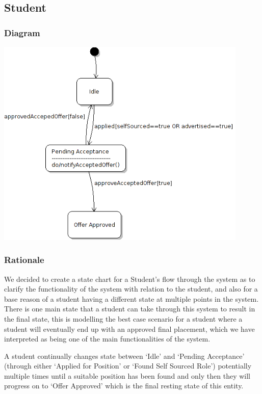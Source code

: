 \documentclass[11pt]{l3deliverable}
\begin{document}
\subsection{Student}

\subsubsection{Diagram}

\includegraphics[width=0.9\textwidth]{studentState.png}

\subsubsection{Rationale}

We decided to create a state chart for a Student's flow through the
system as to clarify the functionality of the system with relation to
the student, and also for a base reason of a student having a
different state at multiple points in the system. There is one main
state that a student can take through this system to result in the
final state, this is modelling the best case scenario for a student
where a student will eventually end up with an approved final
placement, which we have interpreted as being one of the main
functionalities of the system. 

A student continually changes state between `Idle' and `Pending
Acceptance' (through either `Applied for Position' or `Found Self
Sourced Role') potentially multiple times until a suitable position
has been found and only then they will progress on to `Offer
Approved' which is the final resting state of this entity.
\end{document}
